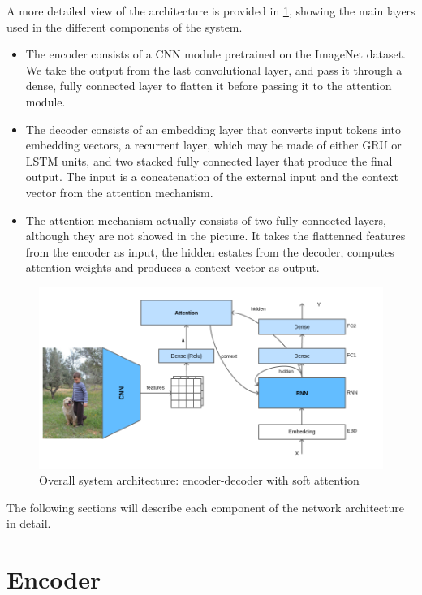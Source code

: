 A more detailed view of the architecture is provided in \cref{fig:overall-architecture}, showing the main layers used in the different components of the system. 
\begin{itemize}
    \item The encoder consists of a CNN module pretrained on the ImageNet dataset. We take the output from the last convolutional layer, and pass it through a dense, fully connected layer to flatten it before passing it to the attention module. 
    \item The decoder consists of an embedding layer that converts input tokens into embedding vectors, a recurrent layer, which may be made of either GRU or LSTM units, and two stacked fully connected layer that produce the final output. The input is a concatenation of the external input and the context vector from the attention mechanism.
    \item The attention mechanism actually consists of two fully connected layers, although they are not showed in the picture. It takes the flattenned features from the encoder as input, the hidden estates from the decoder, computes attention weights and produces a context vector as output.
\end{itemize}


\begin{figure}[hpt]
	\centering
	\includegraphics[scale=0.5]{images/ch4/overall-architecture.png}
	\caption{Overall system architecture: encoder-decoder with soft attention}
	\label{fig:overall-architecture}
\end{figure}


The following sections will describe each component of the network architecture in detail.

\section{Encoder}

